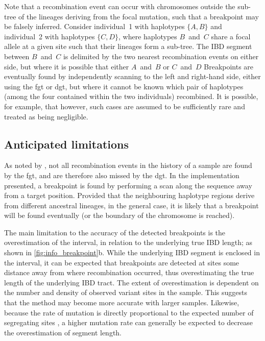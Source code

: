 
Note that a recombination event can occur with chromosomes outside the sub-tree of the lineages deriving from the focal mutation, such that a breakpoint may be falsely inferred.
Consider individual~1 with haplotypes ${\{A,B\}}$ and individual~2 with haplotypes ${\{C,D\}}$, where haplotypes $B$~and~$C$ share a focal allele at a given site such that their lineages form a sub-tree.
The IBD segment between $B$~and~$C$ is delimited by the two nearest recombination events on either side, but where it is possible that either $A$~and~$B$ or $C$~and~$D$
Breakpoints are eventually found by independently scanning to the left and right-hand side, either using the \gls{fgt} or \gls{dgt}, but where it cannot be known which pair of haplotypes (among the four contained within the two individuals) recombined.
It is possible, for example, that
however, such cases are assumed to be sufficiently rare and treated as being negligible.



%
\subsection{Anticipated limitations}
%

As noted by \citet{Hudson:1985wh}, not all recombination events in the history of a sample are found by the \gls{fgt}, and are therefore also missed by the \gls{dgt}.
In the implementation presented, a breakpoint is found by performing a scan along the sequence away from a target position.
Provided that the neighbouring haplotype regions derive from different ancestral lineages, in the general case, it is likely that a breakpoint will be found eventually (or the boundary of the chromosome is reached).

The main limitation to the accuracy of the detected breakpoints is the overestimation of the interval, in relation to the underlying true IBD length; as shown in \cref{fig:info_breakpoint}{b}.
While the underlying IBD segment is enclosed in the interval, it can be expected that breakpoints are detected at sites some distance away from where recombination occurred, thus overestimating the true length of the underlying IBD tract.
The extent of overestimation is dependent on the number and density of observed variant sites in the sample.
This suggests that the method may become more accurate with larger samples.
Likewise, because the rate of mutation is directly proportional to the expected number of segregating sites \citep{Watterson:1975ur}, a higher mutation rate can generally be expected to decrease the overestimation of segment length.

